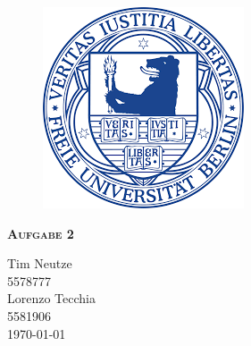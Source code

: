 \documentclass{report}
\begin{document}
\begin{center}
    
\end{center}
    \begin{figure}[htb]
            \centering\includegraphics[width=.5\textwidth]{Immagini/FUlogo.png}
    \end{figure}
    

 {\centering\scshape\LARGE\bfseries Aufgabe 2
    \begin{center}
	   Tim Neutze \\  5578777 \\
       Lorenzo Tecchia \\ 5581906  \\ \today
    \end{center}}


    \newpage
    
    \tableofcontents
    
    
    
    
	
    
    \printbibliography
    
\end{document}
